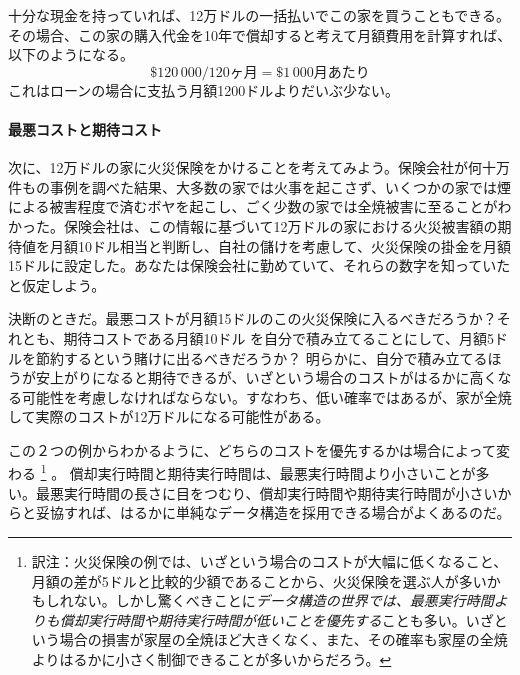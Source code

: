 十分な現金を持っていれば、12万ドルの一括払いでこの家を買うこともできる。その場合、この家の購入代金を10年で償却すると考えて月額費用を計算すれば、以下のようになる。
\[
   \$120\,000 / 120\text{ヶ月} = \$1\,000\text{月あたり}
\]
これはローンの場合に支払う月額1200ドルよりだいぶ少ない。

\paragraph{最悪コストと期待コスト}
次に、12万ドルの家に火災保険をかけることを考えてみよう。保険会社が何十万件もの事例を調べた結果、大多数の家では火事を起こさず、いくつかの家では煙による被害程度で済むボヤを起こし、ごく少数の家では全焼被害に至ることがわかった。保険会社は、この情報に基づいて12万ドルの家における火災被害額の期待値を月額10ドル相当と判断し、自社の儲けを考慮して、火災保険の掛金を月額15ドルに設定した。あなたは保険会社に勤めていて、それらの数字を知っていたと仮定しよう。

決断のときだ。最悪コストが月額15ドルのこの火災保険に入るべきだろうか？それとも、期待コストである月額10ドル
を自分で積み立てることにして、月額5ドルを節約するという賭けに出るべきだろうか？
明らかに、自分で積み立てるほうが安上がりになると期待できるが、いざという場合のコストがはるかに高くなる可能性を考慮しなければならない。すなわち、低い確率ではあるが、家が全焼して実際のコストが12万ドルになる可能性がある。

この２つの例からわかるように、どちらのコストを優先するかは場合によって変わる
\footnote{訳注：火災保険の例では、いざという場合のコストが大幅に低くなること、月額の差が5ドルと比較的少額であることから、火災保険を選ぶ人が多いかもしれない。しかし驚くべきことに\emph{データ構造の世界では、最悪実行時間よりも償却実行時間や期待実行時間が低いことを優先する}ことも多い。いざという場合の損害が家屋の全焼ほど大きくなく、また、その確率も家屋の全焼よりはるかに小さく制御できることが多いからだろう。} %
。
償却実行時間と期待実行時間は、最悪実行時間より小さいことが多い。最悪実行時間の長さに目をつむり、償却実行時間や期待実行時間が小さいからと妥協すれば、はるかに単純なデータ構造を採用できる場合がよくあるのだ。

